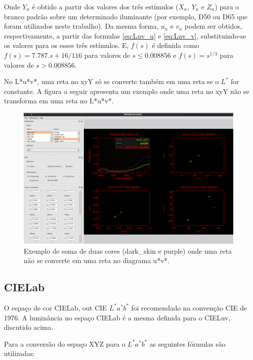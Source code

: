 \par
Onde $Y_n$ é obtido a partir dos valores dos três estímulos ($X_n$, $Y_n$ e
$Z_n$) para o branco padrão sobre um determinado iluminante (por exemplo, D50
ou D65 que foram utilizados neste trabalho). Da mesma forma, $u_n$ e $v_n$
podem ser obtidos, respectivamente, a partir das formulas \ref{eq:Luv_u} e
\ref{eq:Luv_v}, substituindo-se os valores para os esses três estímulos. E,
$f(s)$ é definida como $f(s) = 7.787.s+16/116$ para valores de $s \le 0.008856$
e $f(s) = s^{1/3}$ para valores de $s > 0.008856$.

\par
No L*u*v*, uma reta no xyY só se converte também em uma reta se o $L^*$ for
constante. A figura a seguir apresenta um exemplo onde uma reta no xyY não se
transforma em uma reta no L*u*v*.

\begin{figure}[!htb]
     \centering
     \includegraphics[scale=0.6]{img/luv_no_linearity.png}
     \caption{Exemplo de soma de duas cores (dark_skin e purple) onde uma reta
não se converte em uma reta no diagrama u*v*.}
     \label{fig:luv_no_linearity}
\end{figure}


\subsection{CIELab}
\par
O espaço de cor CIELab, out CIE $L^* a^* b^*$ foi recomendado na convenção CIE
de 1976. A luminância no espaço CIELab é a mesma definida para o CIELuv,
discutido acima.

\par
Para a conversão do espaço XYZ para o $L^*a^*b^*$ as seguintes fórmulas são
utilizadas:

